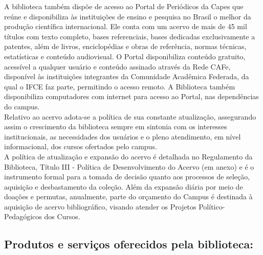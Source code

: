 A biblioteca também dispõe de acesso ao Portal de Periódicos da Capes que reúne e disponibiliza às instituições de ensino e pesquisa no Brasil o melhor da produção científica internacional. Ele conta com um acervo de mais de 45 mil títulos com texto completo, bases referenciais, bases dedicadas exclusivamente a patentes, além de livros, enciclopédias e obras de referência, normas técnicas, estatísticas e conteúdo audiovisual. O Portal disponibiliza conteúdo gratuito, acessível a qualquer usuário e conteúdo assinado através da Rede CAFe, disponível às instituições integrantes da Comunidade Acadêmica Federada, da qual o IFCE faz parte, permitindo o acesso remoto. A Biblioteca também disponibiliza computadores com internet para acesso ao Portal, nas dependências do campus.\\

Relativo ao acervo adota-se a política de sua constante atualização, assegurando assim o crescimento da biblioteca sempre em sintonia com os interesses institucionais, as necessidades dos usuários e o pleno atendimento, em nível informacional, dos cursos ofertados pelo campus.\\

A política de atualização e expansão do acervo é detalhada no Regulamento da Biblioteca, Título III - Política de Desenvolvimento do Acervo (em anexo) e é o instrumento formal para a tomada de decisão quanto aos processos de seleção, aquisição e desbastamento da coleção. Além da expansão diária por meio de doações e permutas, anualmente, parte do orçamento do Campus é destinada à aquisição de acervo bibliográfico, visando atender os Projetos Político-Pedagógicos dos Cursos.\\

\subsection{Produtos e serviços oferecidos pela biblioteca:}

